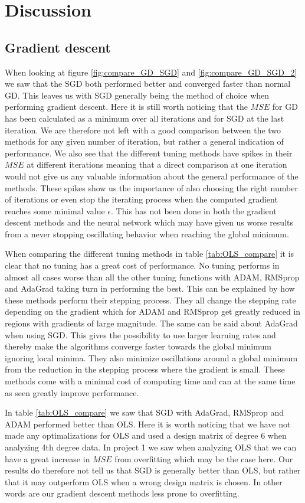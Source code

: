 \documentclass[11pt]{article}
\begin{document}
\section{Discussion}
\subsection{Gradient descent}
When looking at figure \ref{fig:compare_GD_SGD} and \ref{fig:compare_GD_SGD_2} we saw that the SGD both performed better and converged faster than normal GD. This leaves us with SGD generally being the method of choice when performing gradient descent. Here it is still worth noticing that the $MSE$ for GD has been calculated as a minimum over all iterations and for SGD at the last iteration. We are therefore not left with a good comparison between the two methods for any given number of iteration, but rather a general indication of performance.
We also see that the different tuning methods have spikes in their $MSE$ at different iterations meaning that a direct comparison at one iteration would not give us any valuable information about the general performance of the methods. These spikes show us the importance of also choosing the right number of iterations or even stop the iterating process when the computed gradient reaches some minimal value $\epsilon$. This has not been done in both the gradient descent methods and the neural network which may have given us worse results from a never stopping oscillating behavior when reaching the global minimum.

When comparing the different tuning methods in table \ref{tab:OLS_compare} it is clear that no tuning has a great cost of performance. No tuning performs in almost all cases worse than all the other tuning functions with ADAM, RMSprop and AdaGrad taking turn in performing the best. This can be explained by how these methods perform their stepping process. They all change the stepping rate depending on the gradient which for ADAM and RMSprop get greatly reduced in regions with gradients of large magnitude. The same can be said about AdaGrad when using SGD. This gives the possibility to use larger learning rates and thereby make the algorithms converge faster towards the global minimum ignoring local minima. They also minimize oscillations around a global minimum from the reduction in the stepping process where the gradient is small.  These methods come with a minimal cost of computing time and can at the same time as seen greatly improve performance.

In table \ref{tab:OLS_compare} we saw that SGD with AdaGrad, RMSprop and ADAM performed better than OLS. Here it is worth noticing that we have not made any optimalizations for OLS and used a design matrix of degree 6 when analyzing 4th degree data. In project 1 \cite{project1} we saw when analyzing OLS that we can have a great increase in $MSE$ from overfitting which may be the case here. Our results do therefore not tell us that SGD is generally better than OLS, but rather that it may outperform OLS when a wrong design matrix is chosen. In other words are our gradient descent methods less prone to overfitting.
\end{document}
